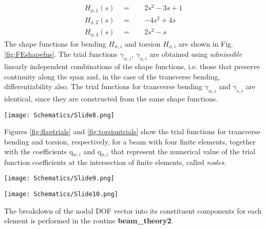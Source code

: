 \begin{align*}
H_{\phi,1}(s) \quad = \quad & 2 s^2 - 3 s + 1\\
H_{\phi,2}(s) \quad = \quad &-4 s^2 + 4 s \\
H_{\phi,3}(s) \quad = \quad & 2 s^2 - s
\end{align*}
The shape functions for bending $H_{w,i}$ and torsion $H_{\phi,i}$ are shown in Fig. \ref{fig:FEshapefns}. The trial functions $\gamma_{w,i}$, $\gamma_{\phi,i}$ are obtained using \emph{admissible} linearly independent combinations of the shape functions, i.e. those that preserve continuity along the span and, in the case of the transverse bending, differentiability also. The trial functions for transverse bending $\gamma_{w,i}$ and $\gamma_{v,i}$ are identical, since they are constructed from the same shape functions. 
\begin{Figure}
 \centering
 \texttt{[image: Schematics/Slide8.png]}
 \vspace{-0.5cm}
 \label{fig:FEshapefns}
\end{Figure}
\vspace{0.5cm}
Figures \ref{fig:flaptrials} and \ref{fig:torsiontrials} show the trial functions for transverse bending and torsion, respectively, for a beam with four finite elements, together with the coefficients q$_{w,i}$ and q$_{\phi,i}$ that represent the numerical value of the trial function coefficients at the intersection of finite elements, called \emph{nodes}. 
\begin{Figure}
 \centering
 \texttt{[image: Schematics/Slide9.png]}
 \vspace{-0.5cm}
 \label{fig:flaptrials}
\end{Figure}
\begin{Figure}
 \centering
 \texttt{[image: Schematics/Slide10.png]}
 \vspace{-0.5cm}
 \label{fig:torsiontrials}
\end{Figure}
\vspace{0.5cm}
The breakdown of the nodal DOF vector into its constituent components for each element is performed in the routine \textbf{beam\_theory2}.
